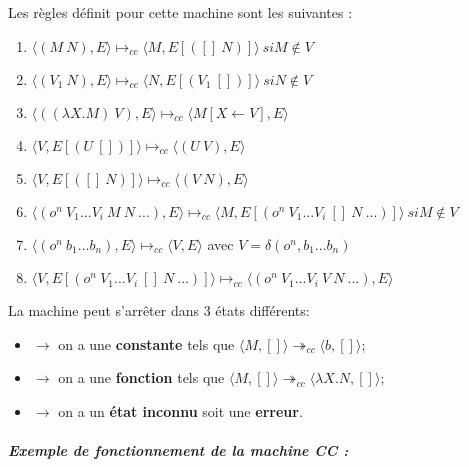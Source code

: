 \documentclass[10pt,a4paper]{article}
\begin{document}
				
				Les règles définit pour cette machine sont les suivantes :
				\begin{enumerate}
		
					\item $\langle(M~N),E\rangle \longmapsto_{cc} \langle M,E[([]~N)]\rangle~si M \notin V$
					
					\item $\langle(V_{1}~N),E\rangle \longmapsto_{cc}  \langle N,E[(V_{1}~[])]\rangle~si N \notin V$
					
					\item $\langle((\lambda X.M)~V),E\rangle \longmapsto_{cc} \langle M[X\longleftarrow V],E\rangle$
					
					\item $\langle V,E[(U~[])]\rangle \longmapsto_{cc} \langle(U~V),E\rangle$
					 
					\item $\langle V,E[([]~N)]\rangle \longmapsto_{cc} \langle(V~N),E\rangle$ 
					
					\item $\langle(o^{n}~V_{1}...V_{i}~M~N~...),E\rangle \longmapsto_{cc}  
					\langle M,E[(o^{n}~V_{1}...V_{i}~[]~N~...)]\rangle~ si M \notin V$
					
					\item $\langle(o^{n}~b_{1}...b_{n}),E\rangle \longmapsto_{cc}  \langle V,E\rangle$ avec $V = \delta(o^{n},b_{1}...b_{n})$ 
					
					\item $\langle V,E[(o^{n}~V_{1}...V_{i}~[]~N~...)]\rangle \longmapsto_{cc} \langle(o^{n}~V_{1}...V_{i}~V~N ~...),E\rangle$ 
				\end{enumerate}
				\bigbreak
				
				
				La machine peut s'arrêter dans 3 états différents:
				\begin{itemize}
					\item[]$\longrightarrow$ on a une \textbf{constante} tels que $\langle M,[]\rangle \twoheadrightarrow_{cc} \langle b,[]\rangle$;
					\item[]$\longrightarrow$ on a une \textbf{fonction} tels que $\langle M,[]\rangle \twoheadrightarrow_{cc} \langle\lambda X.N,[]\rangle$;
					\item[]$\longrightarrow$ on a un \textbf{état inconnu} soit une \textbf{erreur}.
				\end{itemize}
				\bigbreak
				
				
				\subparagraph{Exemple de fonctionnement de la machine CC :}
				
\end{document}

